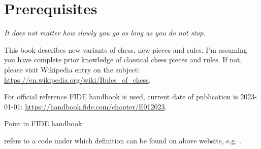 

\chapter*{Prerequisites}
\label{ch:Prerequisites}

\begin{flushright}
\parbox{0.7\textwidth}{
\emph{It does not matter how slowly you go as long as you do not stop. \newline
{} } }
\end{flushright}

\noindent
This book describes new variants of chess, new pieces and rules. I'm assuming you
have complete prior knowledge of classical chess pieces and rules. If not, please
visit Wikipedia entry on the subject: \newline
\href{https://en.wikipedia.org/wiki/Rules\_of\_chess}{https://en.wikipedia.org/wiki/Rules\_of\_chess}.

For official reference \hypertarget{sec:Prerequisites/FIDE Handbook}{FIDE handbook}
is used, current date of publication is 2023-01-01: \newline
\href{https://handbook.fide.com/chapter/E012023}{https://handbook.fide.com/chapter/E012023}.

\hypertarget{sec:Prerequisites/FIDE point}{Point in FIDE handbook} refers to a code
under which definition can be found on above website, e.g. .

\clearpage %
